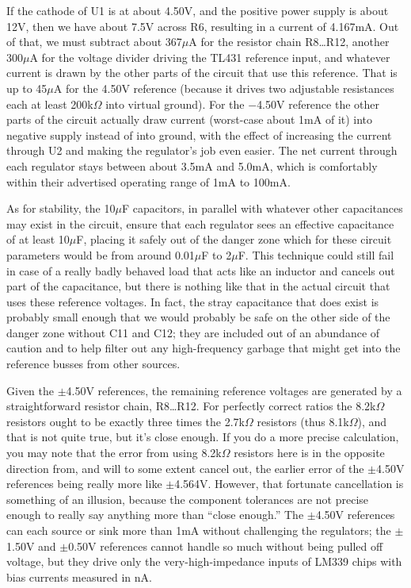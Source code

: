 If the cathode of U1 is at about 4.50V, and the positive power supply is
about 12V, then we have about 7.5V across R6, resulting in a current of
4.167mA.  Out of that, we must subtract about 367$\mu$A for the resistor
chain R8\ldots R12, another 300$\mu$A for the voltage divider driving the
TL431 reference input, and whatever current is drawn by the other parts of
the circuit that use this reference.  That is up to 45$\mu$A for the 4.50V
reference (because it drives two adjustable resistances each at least
200k$\Omega$ into virtual ground).  For the $-$4.50V reference the other parts
of the circuit actually draw current (worst-case about 1mA of it) into
negative supply instead of into ground, with the effect of increasing the
current through U2 and making the regulator's job even easier.  The net
current through each regulator stays between about 3.5mA and 5.0mA, which is
comfortably within their advertised operating range of 1mA to 100mA.

As for stability, the 10$\mu$F capacitors, in parallel with whatever other
capacitances may exist in the circuit, ensure that each regulator sees an
effective capacitance of at least 10$\mu$F, placing it safely out of the
danger zone which for these circuit parameters would be from around
0.01$\mu$F to 2$\mu$F.  This technique could still fail in case of a really
badly behaved load that acts like an inductor and cancels out part of the
capacitance, but there is nothing like that in the actual circuit that uses
these reference voltages.  In fact, the stray capacitance that does exist is
probably small enough that we would probably be safe on the other side of
the danger zone without C11 and C12; they are included out of an abundance
of caution and to help filter out any high-frequency garbage that might get
into the reference busses from other sources.

Given the $\pm$4.50V references, the remaining reference voltages are
generated by a straightforward resistor chain, R8\ldots R12.  For perfectly
correct ratios the 8.2k$\Omega$ resistors ought to be exactly three times
the 2.7k$\Omega$ resistors (thus 8.1k$\Omega$), and that is not quite true,
but it's close enough.  If you do a more precise calculation, you may
note that the error from using 8.2k$\Omega$ resistors here is in the
opposite direction from, and will to some extent cancel out, the earlier error
of the $\pm$4.50V references being really more like $\pm$4.564V.  However,
that fortunate cancellation is something of an illusion, because the
component tolerances are not precise enough to really say anything more than
``close enough.'' The $\pm$4.50V references can each source or sink more
than 1mA without challenging the regulators; the $\pm$1.50V and $\pm$0.50V
references cannot handle so much without being pulled off voltage, but
they drive only the very-high-impedance inputs of LM339 chips with bias
currents measured in nA.

